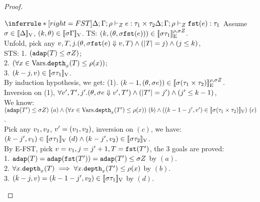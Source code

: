 \documentclass[a4paper,11pt]{article}
\theoremstyle{definition}
\begin{document}
\begin{proof}
\begin{mainitem}
\caseL
{
$
    \inferrule*[right = FST]{
      \Delta; \Gamma; \dmap \tvdash{\nnatA} \expr: \type_1 \times \type_2
    }{
      \Delta; \Gamma; \dmap \tvdash{\nnatA} \eprojl(\expr): \type_1
    }
$
}
Assume $ \sigma \in [\![ \Delta ]\!]_{\text{V}}$, $(k, \theta) \in [\![ \sigma \Gamma ]\!]_{\text{V}}$.
%
TS: $( k, (\theta, \sigma \mathtt{fst}(e)) ) \in [\![ \sigma \tau_1 ]\!]_{\text{E}}^{\rho, \sigma Z} $.\\
%
Unfold, pick any $ v, T, j. (\theta, \sigma \mathtt{fst}(e)   \mathrel{\Downarrow} v, T) \land (|T| = j) \land (j \leq k) $,\\
%
STS: 
1. $ (\mathtt{adap}(T) \leq \sigma Z) $;\\
%
2. $ (\forall x \in \mbox{Vars}. \mathtt{depth}_{x}(T) \leq \rho(x)) $;\\
%
3. $ (k - j, v) \in [\![ \sigma \tau_1 ]\!]_{\text{V}} $.\\
%
By induction hypothesis, we get:
%
(1). $(k-1, (\theta, \sigma e)) \in [\![ \sigma (\tau_1 \times \tau_2) ]\!]_{\text{E}}^{\rho, \sigma Z}$.\\
%
Inversion on (1), $ \forall v', T', j'. (\theta, \sigma e \mathrel{\Downarrow} v', T') \land (|T'| = j') \land (j' \leq k-1) $,\\
%
We know: $(\adap(\tr') \leq \ienv \nnatA) ~ (a)
% 
\land (\forall x \in \mbox{Vars}. \ddep{x}(\tr') \leq \dmap(x)) ~ (b)
%
\land ((\stepiA -1 - j', \valr') \in \lrv{\ienv (\type_1 \times \type_2)}) ~ (c)$.\\
%
Pick any $v_1, v_2$, $v' = (v_1, v_2)$,
%
inversion on $(c)$, we have:\\
%
$(k - j', v_1) \in [\![ \sigma \tau_1 ]\!]_{\text{V}}~(d) \land (k - j', v_2) \in [\![ \sigma \tau_2 ]\!]_{\text{V}}$.\\
%
By E-FST, pick $v = v_1, j = j'+1, T = \mathtt{fst}(T')$, the 3 goals are proved:\\
%
1. $\mathtt{adap}(T) = \mathtt{adap}(\mathtt{fst}(T')) = \mathtt{adap}(T') \leq \sigma Z$ by $(a)$.\\
%
2. $\forall x .\mathtt{depth}_{x}(T) \implies \forall x . \mathtt{depth}_{x}(T') \leq \rho(x)$ by $(b)$.\\
%
3. $(k - j, v) = (k -1- j', v_2) \in
[\![ \sigma \tau_1 ]\!]_{\text{V}}$ by $(d)$.
\\





\end{mainitem}
\end{proof}
\end{document}
